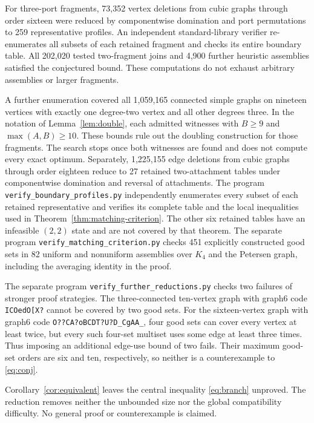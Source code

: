 \documentclass[11pt]{article}
\begin{document}
For three-port fragments, 73,352 vertex deletions from cubic graphs
through order sixteen were reduced by componentwise domination
and port permutations to 259 representative profiles. An independent
standard-library verifier re-enumerates all subsets of each retained
fragment and checks its entire boundary table. All 202,020 tested
two-fragment joins and 4,900 further heuristic assemblies satisfied
the conjectured bound. These computations do not exhaust arbitrary
assemblies or larger fragments.

A further enumeration covered all 1,059,165 connected simple graphs
on nineteen vertices with exactly one degree-two vertex and all
other degrees three. In the notation of Lemma~\ref{lem:double},
each admitted witnesses with $B\geq9$ and $\max(A,B)\geq10$.
These bounds rule out the doubling construction for those fragments.
The search stops once both witnesses are found and does not compute
every exact optimum. Separately, 1,225,155 edge deletions from cubic
graphs through order eighteen reduce to 27 retained two-attachment
tables under componentwise domination and reversal of attachments.
The program \texttt{verify\_boundary\_profiles.py} independently
enumerates every subset of each retained representative and verifies
its complete table and the local inequalities used in
Theorem~\ref{thm:matching-criterion}. The other six retained tables
have an infeasible $(2,2)$ state and are not covered by that theorem.
The separate program \texttt{verify\_matching\_criterion.py} checks
451 explicitly constructed good sets in 82 uniform and nonuniform
assemblies over $K_4$ and the Petersen graph, including the averaging
identity in the proof.

\begin{samepage}
The separate program \texttt{verify\_further\_reductions.py}
checks two failures of stronger proof strategies.
The three-connected ten-vertex graph with graph6 code
\texttt{ICOedO[X?} cannot be covered by two good sets.
For the sixteen-vertex graph with graph6 code
\texttt{O??CA?oBCDT?U?D\_CgAA\_}, four good sets can cover every
vertex at least twice, but every such four-set multiset uses some
edge at least three times. Thus imposing an additional edge-use
bound of two fails. Their maximum good-set orders are six and ten,
respectively, so neither is a counterexample to \eqref{eq:conj}.

Corollary~\ref{cor:equivalent} leaves the central inequality
\eqref{eq:branch} unproved. The reduction removes neither the
unbounded size nor the global compatibility difficulty.
No general proof or counterexample is claimed.
\end{samepage}
\end{document}
